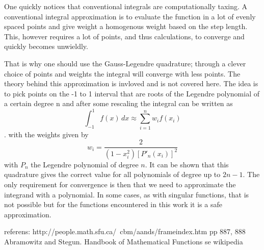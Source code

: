 One quickly notices that conventional integrals are computationally taxing. 
A conventional integral approximation is to evaluate the function in a lot of evenly spaced points and give weight a homogenous weight based on the step length. 
This, however requires a lot of points, and thus calculations, to converge and quickly becomes unwieldly. 

That is why one should use the Gauss-Legendre quadrature; through a clever choice of points and weights the integral will converge with less points. 
The theory behind this approximation is invloved \cite{Gauss magazine nr 17 millenium edition 1800} and is not covered here. 
The idea is to pick points on the -1 to 1 interval that are roots of the Legendre polynomial of a certain degree n and after some rescaling the integral can be written as
\[
\int_{-1}^1 f(x)\,dx \approx \sum_{i=1}^n w_i f(x_i)
\].
with the weights given by
\[ 
w_i = \frac{2}{\left( 1-x_i^2 \right) [P'_n(x_i)]^2}
\] 
with $P_n$ the Legendre polynomial of degree $n$.
It can be shown that this quadrature gives the correct value for all polynomials of degree up to $2n-1$. 
The only requirement for convergence is then that we need to approximate the integrand with a polynomial.
In some cases, as with singular functions, that is not possible but for the functions encountered in this work it is a safe approximation.



referens: http://people.math.sfu.ca/~cbm/aands/frameindex.htm
pp 887, 888 Abramowitz and Stegun. Handbook of Mathematical Functions 
se wikipedia

